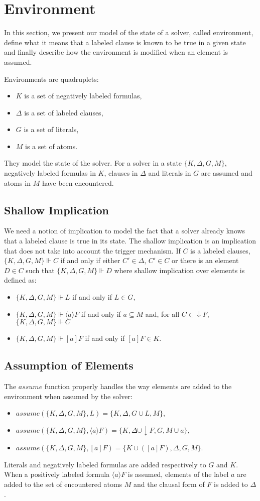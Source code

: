 \documentclass[a4paper,11pt]{article}
\newcommand{\A}{\mathit{assume}}
\begin{document}
\section{Environment}
In this section, we present our model of the state of a solver, called environment, define
what it means that a labeled clause is known to be true in a given state and finally describe how
the environment is modified when an element is assumed.
\bigskip

\noindent
Environments are quadruplets:
\begin{itemize}
 \item $K$ is a set of negatively labeled formulas,
 \item $\Delta$ is a set of labeled clauses,
 \item $G$ is a set of literals,
 \item $M$ is a set of atoms.
\end{itemize}
They model the state of the solver. For a solver in a state $\{K,\Delta,G,M\}$, negatively labeled
formulas in $K$, clauses in $\Delta$ and literals in $G$ are assumed and atoms in $M$ have been
encountered.
\subsection{Shallow Implication}
We need a notion of implication to model the fact that a solver already knows that a labeled clause
is true in its state. The shallow implication is an implication that does not take into account
the trigger mechanism. If $C$ is a labeled clauses, $\{K,\Delta,G,M\}\Vdash C$ if and only if either
$C'\in\Delta$, $C'\in C$ or there is an element $D\in C$ such that $\{K,\Delta,G,M\}\Vdash D$ where shallow
implication over elements is defined as:
\begin{itemize}
 \item $\{K,\Delta,G,M\}\Vdash L$ if and only if $L\in G$,
 \item $\{K,\Delta,G,M\}\Vdash\langle a\rangle F$ if and only if $a\subseteq M$ and, 
for all $C\in\downarrow F$, $\{K,\Delta,G,M\}\Vdash C$ 
 \item $\{K,\Delta,G,M\}\Vdash[a]F$ if and only if $[a]F\in K$.
\end{itemize}
\subsection{Assumption of Elements}
The $\A$ function properly handles the way elements are added to the environment when assumed
by the solver:
\begin{itemize}
 \item $\A(\{K,\Delta,G,M\},L)=\{K,\Delta,G\cup L,M\}$,
 \item $\A(\{K,\Delta,G,M\},\langle a\rangle F)=\{K,\Delta\cup\downarrow F,G,M\cup a\}$,
 \item $\A(\{K,\Delta,G,M\},[a]F)=\{K\cup([a]F),\Delta,G,M\}$.
\end{itemize}
Literals and negatively labeled formulas are added respectively to $G$ and $K$. When a positively
labeled formula $\langle a\rangle F$ is assumed, elements of the label $a$ are added to the
set of encountered atoms $M$ and the clausal form of $F$ is added to $\Delta$.
\end{document}
